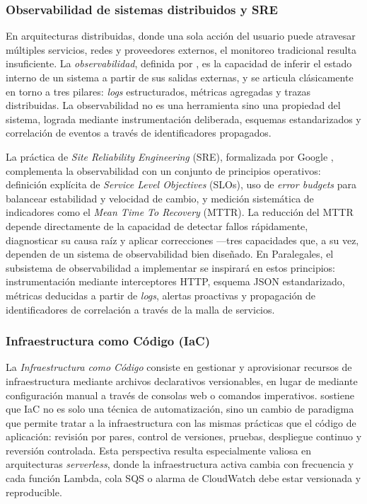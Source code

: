 \subsubsection{Observabilidad de sistemas distribuidos y SRE}

En arquitecturas distribuidas, donde una sola acción del usuario puede atravesar múltiples servicios, redes y proveedores externos, el monitoreo tradicional resulta insuficiente. La \textit{observabilidad}, definida por \textcite{Sridharan2018}, es la capacidad de inferir el estado interno de un sistema a partir de sus salidas externas, y se articula clásicamente en torno a tres pilares: \textit{logs} estructurados, métricas agregadas y trazas distribuidas. La observabilidad no es una herramienta sino una propiedad del sistema, lograda mediante instrumentación deliberada, esquemas estandarizados y correlación de eventos a través de identificadores propagados.

La práctica de \textit{Site Reliability Engineering} (SRE), formalizada por Google \cite{Beyer2016}, complementa la observabilidad con un conjunto de principios operativos: definición explícita de \textit{Service Level Objectives} (SLOs), uso de \textit{error budgets} para balancear estabilidad y velocidad de cambio, y medición sistemática de indicadores como el \textit{Mean Time To Recovery} (MTTR). La reducción del MTTR depende directamente de la capacidad de detectar fallos rápidamente, diagnosticar su causa raíz y aplicar correcciones —tres capacidades que, a su vez, dependen de un sistema de observabilidad bien diseñado. En Paralegales, el subsistema de observabilidad a implementar se inspirará en estos principios: instrumentación mediante interceptores HTTP, esquema JSON estandarizado, métricas deducidas a partir de \textit{logs}, alertas proactivas y propagación de identificadores de correlación a través de la malla de servicios.

\subsubsection{Infraestructura como Código (IaC)}

La \textit{Infraestructura como Código} consiste en gestionar y aprovisionar recursos de infraestructura mediante archivos declarativos versionables, en lugar de mediante configuración manual a través de consolas web o comandos imperativos. \textcite{Morris2020} sostiene que IaC no es solo una técnica de automatización, sino un cambio de paradigma que permite tratar a la infraestructura con las mismas prácticas que el código de aplicación: revisión por pares, control de versiones, pruebas, despliegue continuo y reversión controlada. Esta perspectiva resulta especialmente valiosa en arquitecturas \textit{serverless}, donde la infraestructura activa cambia con frecuencia y cada función Lambda, cola SQS o alarma de CloudWatch debe estar versionada y reproducible.

